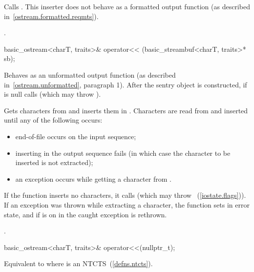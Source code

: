 \begin{itemdescr}
\pnum
\effects
Calls
.
This inserter does not
behave as a formatted output function (as described in~\ref{ostream.formatted.reqmts}).

\pnum
\returns
{}.
\end{itemdescr}

%
\begin{itemdecl}
basic_ostream<charT, traits>& operator<<
    (basic_streambuf<charT, traits>* sb);
\end{itemdecl}

\begin{itemdescr}
\pnum
\effects
Behaves as an unformatted output function (as described in~\ref{ostream.unformatted}, paragraph 1).
After the sentry object is
constructed, if
 is null calls
(which may throw
).

\pnum
Gets characters from 
and inserts them in
.
Characters are read from 
and inserted until any of the following occurs:
\begin{itemize}
\item
end-of-file occurs on the input sequence;
\item
inserting in the output sequence fails
(in which case the character to be inserted is not extracted);
\item
an exception occurs while getting a character from .
\end{itemize}

\pnum
If the function inserts no characters, it calls
(which may throw
~(\ref{iostate.flags})).
If an exception was thrown while extracting a character,
the function sets
in error state, and if
is on in
the caught exception is rethrown.

\pnum
\returns
{}.
\end{itemdescr}

%
\begin{itemdecl}
basic_ostream<charT, traits>& operator<<(nullptr_t);
\end{itemdecl}

\begin{itemdescr}
\pnum
\effects
Equivalent to  where  is an
NTCTS~(\ref{defns.ntcts}).
\end{itemdescr}

